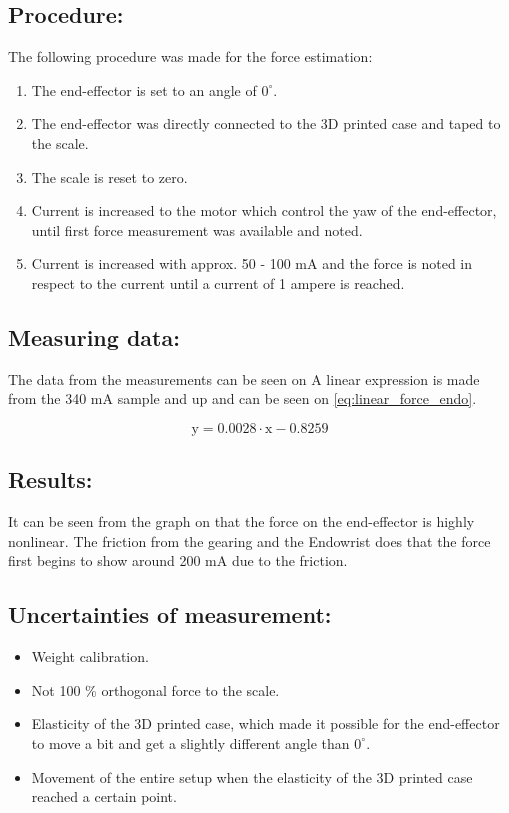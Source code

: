 \subsection*{Procedure:}
The following procedure was made for the force estimation:
\begin{enumerate}
\item The end-effector is set to an angle of $0^\circ$.
\item The end-effector was directly connected to the 3D printed case and taped to the scale.
\item The scale is reset to zero.
\item Current is increased to the motor which control the yaw of the end-effector, until first force measurement was available and noted.
\item Current is increased with approx. 50 - 100 mA and the force is noted in respect to the current until a current of 1 ampere is reached.
\end{enumerate}


\subsection*{Measuring data:}
The data from the measurements can be seen on  A linear expression is made from the 340 mA sample and up and can be seen on \eqref{eq:linear_force_endo}.

\begin{equation}
\text{y} = 0.0028 \cdot \text{x} -0.8259 
\label{eq:linear_force_endo}
\end{equation} 



\subsection*{Results:}
It can be seen from the graph on  that the force on the end-effector is highly nonlinear. The friction from the gearing and the Endowrist does that the force first begins to show around 200 mA due to the friction.




\subsection*{Uncertainties of measurement:}
\begin{itemize}
\item Weight calibration.
\item Not 100 \% orthogonal force to the scale.
\item Elasticity of the 3D printed case, which made it possible for the end-effector to move a bit and get a slightly different angle than $0^\circ$. 
\item Movement of the entire setup when the elasticity of the 3D printed case reached a certain point.
\end{itemize}


